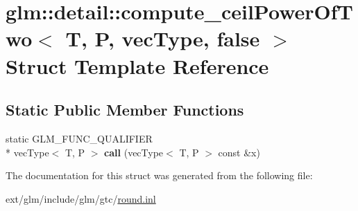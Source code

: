 \hypertarget{structglm_1_1detail_1_1compute__ceil_power_of_two_3_01_t_00_01_p_00_01vec_type_00_01false_01_4}{\section{glm\-:\-:detail\-:\-:compute\-\_\-ceil\-Power\-Of\-Two$<$ T, P, vec\-Type, false $>$ Struct Template Reference}
\label{structglm_1_1detail_1_1compute__ceil_power_of_two_3_01_t_00_01_p_00_01vec_type_00_01false_01_4}
}
\subsection*{Static Public Member Functions}
\begin{DoxyCompactItemize}
\item 
\hypertarget{structglm_1_1detail_1_1compute__ceil_power_of_two_3_01_t_00_01_p_00_01vec_type_00_01false_01_4_a4b44424366238156e2a2d1b19ace1ad5}{static G\-L\-M\-\_\-\-F\-U\-N\-C\-\_\-\-Q\-U\-A\-L\-I\-F\-I\-E\-R \\*
vec\-Type$<$ T, P $>$ {\bfseries call} (vec\-Type$<$ T, P $>$ const \&x)}\label{structglm_1_1detail_1_1compute__ceil_power_of_two_3_01_t_00_01_p_00_01vec_type_00_01false_01_4_a4b44424366238156e2a2d1b19ace1ad5}

\end{DoxyCompactItemize}


The documentation for this struct was generated from the following file\-:\begin{DoxyCompactItemize}
\item 
ext/glm/include/glm/gtc/\hyperlink{round_8inl}{round.\-inl}\end{DoxyCompactItemize}
